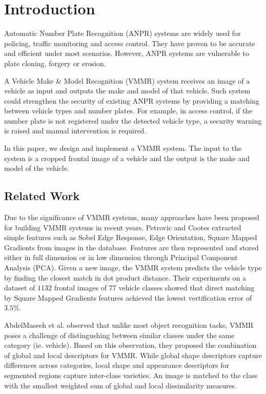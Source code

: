 \chapter{Introduction}
\label{chap:introduction}

Automatic Number Plate Recognition (ANPR) systems are widely used for policing, traffic monitoring and access control.
They have proven to be accurate and efficient under most scenarios.
However, ANPR systems are vulnerable to plate cloning, forgery or erosion.


A Vehicle Make \& Model Recognition (VMMR) system receives an image of a vehicle as input and outputs the make and model of that vehicle.
Such system could strengthen the security of existing ANPR systems by providing a matching between vehicle types and number plates.
For example, in access control, if the number plate is not registered under the detected vehicle type, a security warning is raised and manual intervention is required.

In this paper, we design and implement a VMMR system. The input to the system is a cropped frontal image of a vehicle and the output is the make and model of the vehicle.




\section{Related Work}

Due to the significance of VMMR systems, many approaches have been proposed for building VMMR systems in recent years. 
Petrovic and Cootes \citep{petrovic2004analysis} extracted simple features such as Sobel Edge Response, Edge Orientation, Square Mapped Gradients from images in the database. 
Features are then represented and stored either in full dimension or in low dimension through Principal Component Analysis (PCA).
Given a new image, the VMMR system predicts the vehicle type by finding the closest match in dot product distance.
Their experiments on a dataset of $1132$ frontal images of $77$ vehicle classes showed that direct matching by Square Mapped Gradients features achieved the lowest vertification error of $3.5\%$.

AbdelMaseeh et al. \citep{abdelmaseeh2012car} observed that unlike most object recognition tasks, VMMR poses a challenge of distingushing between similar classes under the same category (ie. vehicle).
Based on this observation, they proposed the combination of global and local descriptors for VMMR.
While global shape descriptors capture differences across categories, local shape and appearance descriptors for segmented regions capture inter-class varieties.
An image is matched to the class with the smallest weighted sum of global and local dissimilarity measures.

